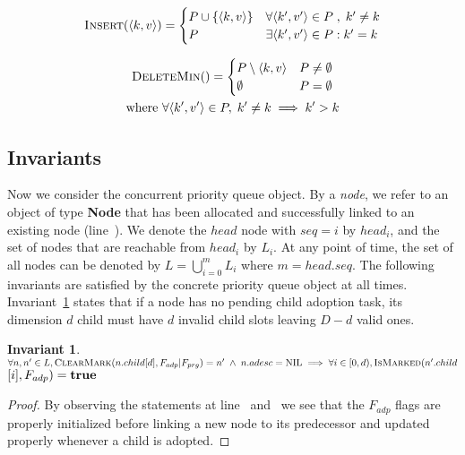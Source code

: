 \documentclass[10pt,journal,letterpaper,compsoc]{IEEEtran}
\newtheorem{invariant}{Invariant}
\newcommand\NIL{\text{NIL}}
\newcommand\TRUE{\text{\textbf{true}}}
\begin{document}
\begin{equation} \label{eq:insert}
    \textsc{Insert}(\langle k,v \rangle)= \begin{cases}
        P \cup \{\langle k,v\rangle\} & \forall \langle k',v'\rangle \in P\;,\;k' \neq k\\
        P & \exists \langle k',v' \rangle \in P : k'=k
    \end{cases}
\end{equation}

\begin{gather}
    \label{eq:delete1}
    \textsc{DeleteMin}()= \begin{cases}
        P \setminus {\langle k,v \rangle} & P\neq\emptyset\\
        \emptyset & P=\emptyset
    \end{cases}
    \\
    \label{eq:delete2}
    \text{where } \forall \langle k',v' \rangle \in P,\;k' \neq k \implies k' > k
\end{gather}

\subsection{Invariants}
Now we consider the concurrent priority queue object. 
By a \emph{node}, we refer to an object of type \textbf{Node} that has been allocated and successfully linked to an existing node (line~). 
We denote the $head$ node with $seq=i$ by $head_i$, and the set of nodes that are reachable from $head_i$ by $L_i$. 
At any point of time, the set of all nodes can be denoted by $L=\bigcup_{i=0}^{m}L_i$ where $m = head.seq$.
The following invariants are satisfied by the concrete priority queue object at all times. 
Invariant~\ref{inv:adpflag} states that if a node has no pending child adoption task, its dimension $d$ child must have $d$ invalid child slots leaving $D-d$ valid ones.

\begin{invariant} \label{inv:adpflag}
$\forall n,n' \in L,\textsc{ClearMark}(n.child[d],F_{adp}|F_{prg}) \linebreak=n'\;\land\;n.adesc=\NIL \implies \forall i \in [0,d), \textsc{IsMarked}(n'.child$ $[i],F_{adp})=\TRUE$
\end{invariant}
\begin{proof}
    By observing the statements at line~ and~ we see that the $F_{adp}$ flags are properly initialized before linking a new node to its predecessor and updated properly whenever a child is adopted.
\end{proof}
\end{document}
